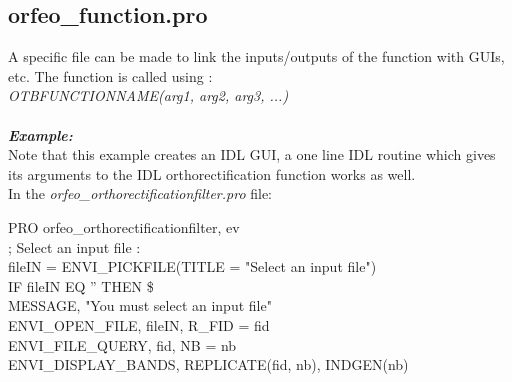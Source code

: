 \subsection{orfeo\_function.pro}
A specific file can be made to link the inputs/outputs of the function with GUIs, etc.
The function is called using :\\
\emph{OTBFUNCTIONNAME(arg1, arg2, arg3, ...)}
\\
\\
\emph{\textbf{Example:}}\\
\indent Note that this example creates an IDL GUI, a one line IDL routine which gives its arguments to the IDL orthorectification function works as well.\\
\indent In the \emph{orfeo\_orthorectificationfilter.pro} file:\\
\begin{scriptsize}
\indent PRO orfeo\_orthorectificationfilter, ev\\
\indent ; Select an input file :\\
\indent fileIN = ENVI\_PICKFILE(TITLE = "Select an input file")\\
\indent IF fileIN EQ '' THEN \$\\
\indent MESSAGE, "You must select an input file"\\
\indent ENVI\_OPEN\_FILE, fileIN, R\_FID = fid\\
\indent ENVI\_FILE\_QUERY, fid, NB = nb\\
\indent ENVI\_DISPLAY\_BANDS, REPLICATE(fid, nb), INDGEN(nb)\\


\end{scriptsize}
